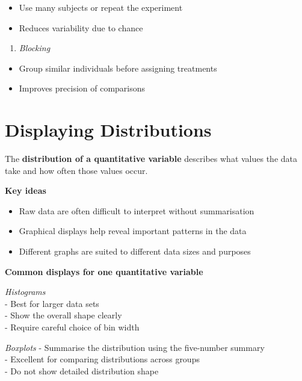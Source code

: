 \documentclass[
  11pt,
  oneside]{scrbook}
\providecommand{\tightlist}{%
  \setlength{\itemsep}{0pt}\setlength{\parskip}{0pt}}
\begin{document}
\begin{itemize}
\tightlist
\item
  Use many subjects or repeat the experiment
\item
  Reduces variability due to chance
\end{itemize}

\begin{enumerate}
\def\labelenumi{\arabic{enumi}.}
\setcounter{enumi}{3}
\tightlist
\item
  \emph{Blocking}
\end{enumerate}

\begin{itemize}
\tightlist
\item
  Group similar individuals before assigning treatments
\item
  Improves precision of comparisons
\end{itemize}

\section{Displaying Distributions}\label{displaying-distributions}

The \textbf{distribution of a quantitative variable} describes what values the data take
and how often those values occur.

\textbf{Key ideas}

\begin{itemize}
\tightlist
\item
  Raw data are often difficult to interpret without summarisation
\item
  Graphical displays help reveal important patterns in the data
\item
  Different graphs are suited to different data sizes and purposes
\end{itemize}

\textbf{Common displays for one quantitative variable}

\emph{Histograms}\\
- Best for larger data sets\\
- Show the overall shape clearly\\
- Require careful choice of bin width

\emph{Boxplots}
- Summarise the distribution using the five-number summary\\
- Excellent for comparing distributions across groups\\
- Do not show detailed distribution shape
\end{document}
